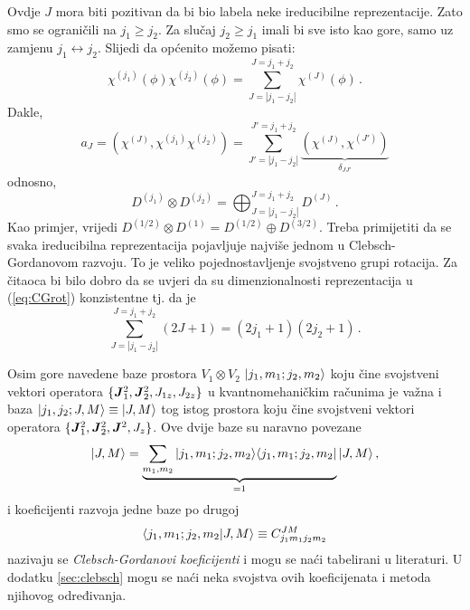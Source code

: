 Ovdje $J$ mora biti pozitivan da bi bio labela neke ireducibilne
reprezentacije. Zato smo se ograničili na $j_1\ge j_2$.
Za slučaj $j_2 \ge j_1$ imali bi sve isto kao gore, samo uz zamjenu $j_1 \leftrightarrow
j_2$. Slijedi da općenito možemo pisati:
\begin{equation}
 \chi^{(j_1)}(\phi)\chi^{(j_2)}(\phi)=
\sum_{J=|j_1-j_2|}^{J=j_1+j_2} \chi^{(J)}(\phi) \,.
\end{equation}
Dakle,
\begin{equation}
 a_J = \left(\chi^{(J)}, \chi^{(j_1)}\chi^{(j_2)}\right) =
 \sum_{J'=|j_1-j_2|}^{J'=j_1+j_2} 
\underbrace{\left(\chi^{(J)}, \chi^{(J')}\right)}_{\delta_{JJ'}}
\end{equation}
odnosno,
\begin{equation}
D^{(j_1)} \otimes D^{(j_2)} = \bigoplus_{J=|j_1-j_2|}^{J=j_1+j_2} 
 D^{(J)} \,. \label{eq:CGrot}
\end{equation}
Kao primjer, vrijedi $D^{(1/2)}\otimes D^{(1)} = D^{(1/2)} \oplus D^{(3/2)}$.
Treba primijetiti da se svaka ireducibilna reprezentacija pojavljuje najviše jednom
u  Clebsch-Gordanovom razvoju. To je veliko pojednostavljenje svojstveno grupi rotacija.
Za čitaoca bi bilo dobro da se uvjeri da su dimenzionalnosti reprezentacija
u (\ref{eq:CGrot}) konzistentne tj. da je
\begin{displaymath}
    \sum_{J=|j_1-j_2|}^{J=j_1+j_2} (2J+1) = (2j_1+1)(2j_2+1) \,.
\end{displaymath}

Osim gore navedene baze prostora $V_1 \otimes V_2$
$| j_1, m_1; j_2, m_2 \rangle$ koju čine
svojstveni vektori operatora $\{\jsqj, \jsqd, J_{1z}, J_{2z}\}$ u kvantnomehaničkim
računima je važna i baza $| j_1, j_2; J, M \rangle\equiv| J, M \rangle$
tog istog prostora koju čine svojstveni vektori operatora
$\{\jsqj, \jsqd, \jsq, J_z\}$.
Ove dvije baze su naravno povezane
\begin{equation}
| J, M \rangle = \underbrace{\sum_{m_1,m_2}| j_1, m_1; j_2, m_2 \rangle
\langle j_1, m_1; j_2, m_2 |}_{=1}
| J, M \rangle \,,
\end{equation}
i koeficijenti razvoja jedne baze po drugoj
\begin{equation}
 \langle j_1, m_1; j_2, m_2 | J, M\rangle \equiv C^{JM}_{j_1m_1j_2m_2}
 \label{eq:defCG}
\end{equation}
nazivaju se \emph{Clebsch-Gordanovi koeficijenti} i mogu se naći tabelirani
    u literaturi. U dodatku \ref{sec:clebsch} mogu se naći neka svojstva
ovih koeficijenata i metoda njihovog određivanja.


